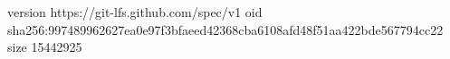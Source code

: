 version https://git-lfs.github.com/spec/v1
oid sha256:997489962627ea0e97f3bfaeed42368cba6108afd48f51aa422bde567794cc22
size 15442925
